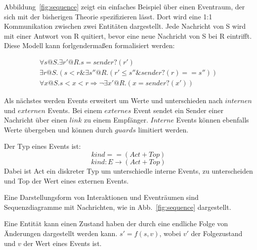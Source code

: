 Abbildung~\ref{fig:sequence} zeigt ein einfaches Beispiel über einen Eventraum,
der sich mit der bisherigen Theorie spezifizieren lässt. Dort wird eine 1:1
Kommunikation zwischen zwei Entitäten dargestellt. Jede Nachricht von S wird mit
einer Antwort von R quitiert, bevor eine neue Nachricht von S bei R eintrifft.
Diese Modell kann forlgendermaßen formalisiert werden:~\cite{bickford2005causal}

\begin{gather*}
  \forall s@S.\exists r'@R.s=sender?(r')\\
  \exists r@S.(s<r\&\exists s''@R.(r'\leq s''\& sender?(r) == s''))\\
  \forall x@S.s<x<r\Rightarrow \neg\exists x'@R.(x=sender?(x'))
\end{gather*}

Als nächstes werden Events erweitert um Werte und unterschieden nach
$internen$ und $externen$ Events. Bei einem $externes$ Event sendet ein Sender
einer Nachricht über einen $link$ zu einem Empfänger. $Interne$ Events können
ebenfalls Werte übergeben und können durch $guards$ limitiert werden.~\cite{bickford2005causal}

\begin{defi}
  Der Typ eines Events ist:
  \[
    kind == (Act+Top)
  \]
  \[
    kind: E\rightarrow (Act+Top)
  \]
  Dabei ist Act ein diskreter Typ um unterschiedle interne Events, zu
  unterscheiden und Top der Wert eines externen Events.
\end{defi}

Eine Darstellungsform von Interaktionen und Eventräumen sind Sequenzdiagramme
mit Nachrichten, wie in Abb.~\ref{fig:sequence} dargestellt.


\begin{defi}
  Eine Entität kann einen Zustand haben der durch eine endliche Folge
  von Änderungen dargestellt werden kann. $s'=f(s,v)$, wobei
  $v'$ der Folgezustand und $v$ der Wert eines Events ist.  
\end{defi}



